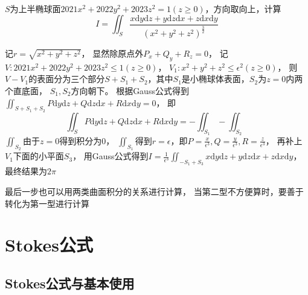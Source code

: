 ~

\begin{exercise}[推广形式]
  $S$为上半椭球面$2021x^2 + 2022y^2 + 2023z^2 = 1(z \geq 0)$，方向取向上，计算
  \begin{equation*}
    I = \iint_S \frac{x\mathrm{d} y \mathrm{d} z + y\mathrm{d} z \mathrm{d} x + z \mathrm{d} x \mathrm{d} y}{(x^2 + y^2 + z^2)^{\frac{3}{2}}}
  \end{equation*}
\end{exercise}

\begin{solution}
  记$r = \sqrt{x^2 + y^2 + z^2}$，
  显然除原点外$P_x+Q_y+R_z = 0$，
  记$V:2021x^2 + 2022y^2 + 2023z^2 \leq 1(z \geq 0)$，
  $V_1:x^2 + y^2 + z^2 \leq \epsilon^2(z \geq 0)$，
  则$V - V_1$的表面分为三个部分$S + S_1 + S_2$，其中$S_1$是小椭球体表面，$S_2$为$z = 0$内两个直底面，
  $S_1,S_2$方向朝下。
  根据Gauss公式得到$\iint_{S + S_1 + S_2}P\mathrm{d} y \mathrm{d} z + Q \mathrm{d} z \mathrm{d} x + R \mathrm{d} x \mathrm{d} y = 0$，
  即
  \begin{equation*}
    \iint_S P\mathrm{d} y \mathrm{d} z + Q \mathrm{d} z \mathrm{d} x + R \mathrm{d} x \mathrm{d} y = - \iint_{S_1} - \iint _{S_2}
  \end{equation*}
  $\iint_{S_2}$由于$z = 0$得到积分为$0$，
  $\iint_{S_1}$得到$r = \epsilon$，即$P = \frac{x}{\epsilon^3}, Q = \frac{y}{\epsilon^3}, R = \frac{z}{\epsilon^3}$，
  再补上$V_1$下面的小平面$S_3$，
  用Gauss公式得到$I = \frac{1}{\epsilon^3} \iint_{-S_1 + S_3}x\mathrm{d} y \mathrm{d} z + y\mathrm{d} z \mathrm{d} x + z \mathrm{d} x \mathrm{d} y$，
  最终结果为$2\pi$
\end{solution}

\begin{note}
  最后一步也可以用两类曲面积分的关系进行计算，
  当第二型不方便算时，要善于转化为第一型进行计算
\end{note}


\section{Stokes公式}

\subsection{Stokes公式与基本使用}

